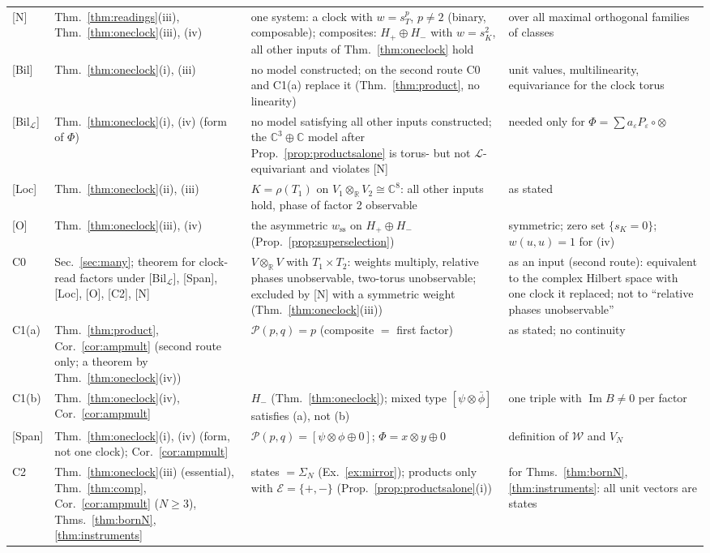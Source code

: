 \documentclass[aps,pra,onecolumn,superscriptaddress,nofootinbib,10pt]{revtex4-2}
\theoremstyle{definition}
\theoremstyle{remark}
\newcommand{\R}{\mathbb{R}}
\newcommand{\C}{\mathbb{C}}
\newcommand{\cL}{\mathcal{L}}
\newcommand{\im}{\operatorname{Im}}
\begin{document}
\begin{table}[h]
\begin{tabular}{@{}p{}p{}p{}p{}@{}}
{[N]} & Thm.~\ref{thm:readings}(iii), Thm.~\ref{thm:oneclock}(iii), (iv) & one system: a clock with $w=s_T^p$, $p\ne2$ (binary, composable); composites: $H_+\oplus H_-$ with $w=s_K^2$, all other inputs of Thm.~\ref{thm:oneclock} hold & over all maximal orthogonal families of classes\\
{[Bil]} & Thm.~\ref{thm:oneclock}(i), (iii) & no model constructed; on the second route C0 and C1(a) replace it (Thm.~\ref{thm:product}, no linearity) & unit values, multilinearity, equivariance for the clock torus\\
{[Bil$_\cL$]} & Thm.~\ref{thm:oneclock}(i), (iv) (form of $\Phi$) & no model satisfying all other inputs constructed; the $\C^3\oplus\C$ model after Prop.~\ref{prop:productsalone} is torus- but not $\cL$-equivariant and violates [N] & needed only for $\Phi=\sum a_\varepsilon P_\varepsilon\circ\otimes$\\
{[Loc]} & Thm.~\ref{thm:oneclock}(ii), (iii) & $K=\rho(T_1)$ on $V_1\otimes_\R V_2\cong\C^8$: all other inputs hold, phase of factor 2 observable & as stated\\
{[O]} & Thm.~\ref{thm:oneclock}(iii), (iv) & the asymmetric $w_{\mathrm{ss}}$ on $H_+\oplus H_-$ (Prop.~\ref{prop:superselection}) & symmetric; zero set $\{s_K=0\}$; $w(u,u)=1$ for (iv)\\
C0 & Sec.~\ref{sec:many}; theorem for clock-read factors under [Bil$_\cL$], [Span], [Loc], [O], [C2], [N] & $V\otimes_\R V$ with $T_1\times T_2$: weights multiply, relative phases unobservable, two-torus unobservable; excluded by [N] with a symmetric weight (Thm.~\ref{thm:oneclock}(iii)) & as an input (second route): equivalent to the complex Hilbert space with one clock it replaced; not to ``relative phases unobservable''\\
C1(a) & Thm.~\ref{thm:product}, Cor.~\ref{cor:ampmult} (second route only; a theorem by Thm.~\ref{thm:oneclock}(iv)) & $\mathcal P(p,q)=p$ (composite $=$ first factor) & as stated; no continuity\\
C1(b) & Thm.~\ref{thm:oneclock}(iv), Cor.~\ref{cor:ampmult} & $H_-$ (Thm.~\ref{thm:oneclock}); mixed type $[\psi\otimes\bar\phi]$ satisfies (a), not (b) & one triple with $\im B\ne0$ per factor\\
{[Span]} & Thm.~\ref{thm:oneclock}(i), (iv) (form, not one clock); Cor.~\ref{cor:ampmult} & $\mathcal P(p,q)=[\psi\otimes\phi\oplus0]$; $\Phi=x\otimes y\oplus0$ & definition of $\mathcal W$ and $V_N$\\
C2 & Thm.~\ref{thm:oneclock}(iii) (essential), Thm.~\ref{thm:comp}, Cor.~\ref{cor:ampmult} ($N\ge3$), Thms.~\ref{thm:bornN}, \ref{thm:instruments} & states $=\Sigma_N$ (Ex.~\ref{ex:mirror}); products only with $\mathcal E=\{+,-\}$ (Prop.~\ref{prop:productsalone}(i)) & for Thms.~\ref{thm:bornN}, \ref{thm:instruments}: all unit vectors are states\\

\end{tabular}
\end{table}
\end{document}
